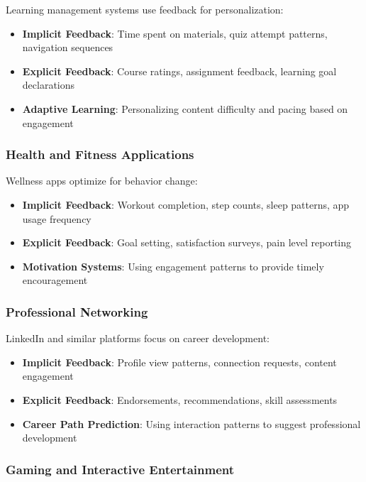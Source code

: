 Learning management systems use feedback for personalization:

\begin{itemize}
    \item \textbf{Implicit Feedback}: Time spent on materials, quiz attempt patterns, navigation sequences
    \item \textbf{Explicit Feedback}: Course ratings, assignment feedback, learning goal declarations
    \item \textbf{Adaptive Learning}: Personalizing content difficulty and pacing based on engagement
\end{itemize}

\subsubsection{Health and Fitness Applications}

Wellness apps optimize for behavior change:

\begin{itemize}
    \item \textbf{Implicit Feedback}: Workout completion, step counts, sleep patterns, app usage frequency
    \item \textbf{Explicit Feedback}: Goal setting, satisfaction surveys, pain level reporting
    \item \textbf{Motivation Systems}: Using engagement patterns to provide timely encouragement
\end{itemize}

\subsubsection{Professional Networking}

LinkedIn and similar platforms focus on career development:

\begin{itemize}
    \item \textbf{Implicit Feedback}: Profile view patterns, connection requests, content engagement
    \item \textbf{Explicit Feedback}: Endorsements, recommendations, skill assessments
    \item \textbf{Career Path Prediction}: Using interaction patterns to suggest professional development
\end{itemize}

\subsubsection{Gaming and Interactive Entertainment}

